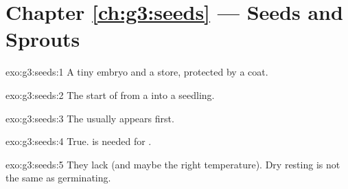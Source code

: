 \section*{Chapter \ref{ch:g3:seeds} --- Seeds and Sprouts}

\begin{solution}{exo:g3:seeds:1}
A tiny  embryo and a  store, protected by a  coat.
\end{solution}

\begin{solution}{exo:g3:seeds:2}
The start of  from a  into a seedling.
\end{solution}

\begin{solution}{exo:g3:seeds:3}
The  usually appears first.
\end{solution}

\begin{solution}{exo:g3:seeds:4}
True.  is needed for .
\end{solution}

\begin{solution}{exo:g3:seeds:5}
They lack  (and maybe the right temperature). Dry resting is
not the same as germinating.
\end{solution}

